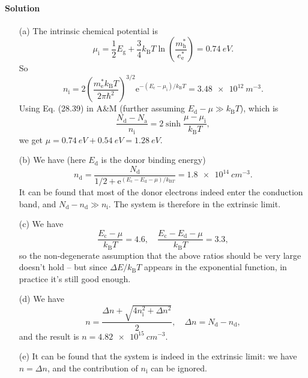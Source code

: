 \documentclass[hyperref, a4paper]{article}
\newcommand*{\ee}{\mathrm{e}}
\begin{document}
\paragraph{Solution} \begin{itemize}
\item[(a)] The intrinsic chemical potential is 
\begin{equation}
    \mu_{\text{i}} = \frac{1}{2} E_{\text{g}} + \frac{3}{4} k_{\text{B}} T \ln(\frac{m^*_{\text{h}} }{e^*_{\text{e}}}) = \SI{0.74}{eV}.
\end{equation}
So 
\begin{equation}
    n_{\text{i}} = 2 \left( \frac{m_\text{e}^* k_{\text{B}} T}{2 \pi \hbar^2} \right)^{3/2} 
    \ee^{- (E_{\text{c}} - \mu_{\text{i}}) / k_{\text{B}} T} 
    = \SI{3.48e12}{m^{-3}}.
\end{equation}
Using Eq. (28.39) in A\&M (further assuming $E_{\text{d}} - \mu \gg k_{\text{B}} T$), which is 
\begin{equation}
    \frac{N_\text{d} - N_\text{a}}{n_\text{i}} = 2 \sinh \frac{\mu - \mu_{\text{i}}}{k_{\text{B}} T},
\end{equation}
we get $\mu = \SI{0.74}{eV} + \SI{0.54}{eV} = \SI{1.28}{eV}$.

\item[(b)] We have (here $E_{\text{d}}$ is the donor binding energy)
\begin{equation}
    n_{\text{d}} = \frac{N_{\text{d}}}{1/2 + \ee^{(E_{\text{c}} - E_{\text{d}} - \mu) / k_{\text{B} T}}}
    = \SI{1.8e14}{cm^{-3}}.
\end{equation}
It can be found that most of the donor electrons indeed enter the conduction band,
and $N_{\text{d}} - n_{\text{d}} \gg n_{\text{i}}$.
The system is therefore in the extrinsic limit.

\item[(c)] We have 
\[
    \frac{E_{\text{c}} - \mu}{k_{\text{B}} T} = 4.6, \quad 
    \frac{E_{\text{c}} - E_{\text{d}} - \mu}{k_{\text{B}} T} = 3.3,
\]
so the non-degenerate assumption that the above ratios should be very large 
doesn't hold -- but since $\Delta E / k_{\text{B}} T$ appears in the exponential function,
in practice it's still good enough.

\item[(d)] We have 
\begin{equation}
    n = \frac{\Delta n + \sqrt{ 4 n_{\text{i}}^2 + \Delta n^2 }}{2}, 
    \quad \Delta n = N_{\text{d}} - n_{\text{d}},
\end{equation}
and the result is $n = \SI{4.82e15}{cm^{-3}}$.

\item[(e)] It can be found that the system is indeed in the extrinsic limit:
we have $n = \Delta n$, 
and the contribution of $n_{\text{i}}$ can be ignored.

\end{itemize}
\end{document}
